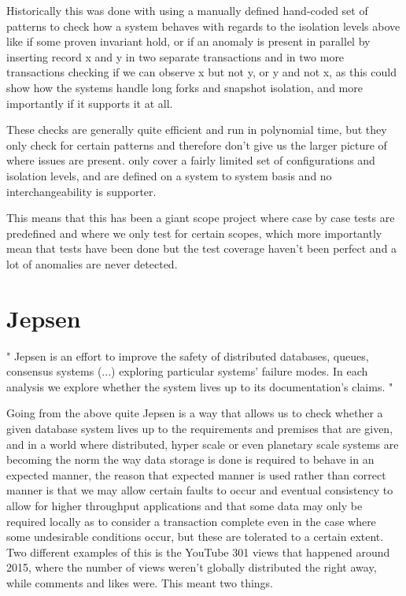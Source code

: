 \documentclass[a4paper,10pt,titlepage]{report}
\begin{document}
Historically this was done with using a manually defined hand-coded set of patterns to check how a system behaves with regards to the isolation levels above like if some proven invariant hold, or if an anomaly is present in parallel  by inserting record x and y in two separate transactions and in two more transactions checking if we can observe x but not y, or y and not x, as this could show how the systems handle long forks and snapshot isolation, and more importantly if it supports it at all.

These checks are generally quite efficient and run in polynomial time, but they only check for certain patterns and therefore don't give us the larger picture of where issues are present.  only cover a fairly limited set of configurations and isolation levels, and are defined on a system to system basis and no interchangeability is supporter.

This means that this has been a giant scope project where case by case tests are predefined and where we only test for certain scopes, which more importantly mean that tests have been done but the test coverage haven't been perfect and a lot of anomalies are never detected.



\section{Jepsen}
"
Jepsen is an effort to improve the safety of distributed databases, queues, consensus systems  (...) exploring particular systems' failure modes. In each analysis we explore whether the system lives up to its documentation's claims.
"\cite{jepsonio}
\\
\vspace{5mm}

Going from the above quite Jepsen is a way that allows us to check whether a given database system lives up to the requirements and premises that are given, and in a world where distributed, hyper scale or even planetary scale systems are becoming the norm the way data storage is done is required to behave in an expected manner, the reason that expected manner is used rather than correct manner is that we may allow certain faults to occur and eventual consistency to allow for higher throughput applications and that some data may only be required locally as to consider a transaction complete even in the case where some undesirable conditions occur, but these are tolerated to a certain extent. \\
\vspace{5mm}
Two different examples of this is the YouTube 301 views that happened around 2015, where the number of views weren't globally distributed the right away, while comments and likes were. This meant two things. \\
\end{document}
